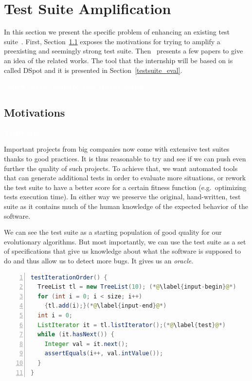 \documentclass[11pt]{sdm}
\newcommand{\addref}[1]{\colorbox{TealBlue!100}{\textcolor{white}{\textbf{$[$\ifx&#1&\ \else#1\fi$]$}}}}
\newcommand{\todo}[1]{\colorbox{Red!75}{\textcolor{white}{\textbf{TODO\ifx&#1&\else: #1\fi}}}}
\newcommand{\dspot}{DSpot\xspace}
\begin{document}
\section{Test Suite Amplification}
\label{tsa}
In this section we present the specific problem of enhancing an existing test suite~\cite{danglot2017emerging}.
First, Section~\ref{motiv_tsa} exposes the motivations for trying to amplify a preexisting and seemingly strong test suite.
Then~ presents a few papers to give an idea of the related works.
The tool that the internship will be based on is called \dspot{} and it is presented in Section~\ref{testsuite_eval}.

\addref{new survey paper}

\subsection{Motivations}
\label{motiv_tsa}
\todo{}

Important projects from big companies now come with extensive test suites thanks to good practices.
It is thus reasonable to try and see if we can push even further the quality of such projects.
To achieve that, we want automated tools that can generate additional tests in order to evaluate more situations, or rework the test suite to have a better score for a certain fitness function (e.g.\ optimizing tests execution time).
In either way we preserve the original, hand-written, test suite as it contains much of the human knowledge of the expected behavior of the software.

We can see the test suite as a starting population of good quality for our evolutionary algorithms.
But most importantly, we can use the test suite as a set of specifications that give us knowledge about what the software is supposed to do and thus allow us to detect more bugs.
It gives us an \textit{oracle}.

\begin{lstlisting}[caption={An archetypal example of an object-oriented test case  (taken from the Apache Commons Collections, in the class TreeListTest, line 270)},label=lst:archetype,float,language=java,numbers=left]
testIterationOrder() {
  TreeList tl = new TreeList(10); (*@\label{input-begin}@*)
  for (int i = 0; i < size; i++)
    {tl.add(i);}(*@\label{input-end}@*)
  int i = 0;
  ListIterator it = tl.listIterator();(*@\label{test}@*)
  while (it.hasNext()) {
    Integer val = it.next();
    assertEquals(i++, val.intValue());
  }
}
\end{lstlisting}
\end{document}
